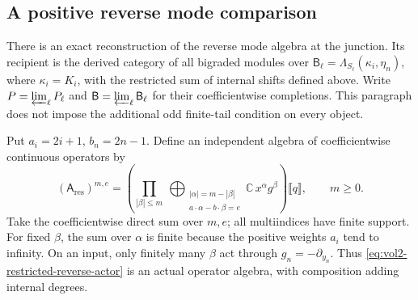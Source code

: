 \subsection{A positive reverse mode comparison}

There is an exact reconstruction of the reverse mode algebra
at the junction. Its recipient is the derived category of
all bigraded modules over
\(\mathsf B_\ell=\Lambda_{S_\ell}(\kappa_i,\eta_n)\),
where \(\kappa_i=K_i\), with the restricted sum of internal
shifts defined above. Write \(P=\varprojlim_\ell P_\ell\)
and \(\mathsf B=\varprojlim_\ell\mathsf B_\ell\) for their
coefficientwise completions.
This paragraph does not impose the additional odd finite-tail
condition on every object.

Put \(a_i=2i+1\), \(b_n=2n-1\). Define an independent
algebra of coefficientwise continuous operators by
\begin{equation}\label{eq:vol2-restricted-reverse-actor}
 (\mathsf A_{\mathrm{res}})^{m,e}
 =
 \left(
 \prod_{|\beta|\le m}
 \ \bigoplus_{\substack{|\alpha|=m-|\beta|\\
                 a\cdot\alpha-b\cdot\beta=e}}
 \mathbb C\,x^\alpha g^\beta
 \right)\llbracket q\rrbracket,\qquad m\ge0.
\end{equation}
Take the coefficientwise direct sum over \(m,e\); all
multiindices have finite support. For fixed \(\beta\),
the sum over \(\alpha\) is finite because the positive
weights \(a_i\) tend to infinity. On an input, only finitely
many \(\beta\) act through \(g_n=-\partial_{y_n}\).
Thus \eqref{eq:vol2-restricted-reverse-actor} is an actual
operator algebra, with composition adding internal degrees.

